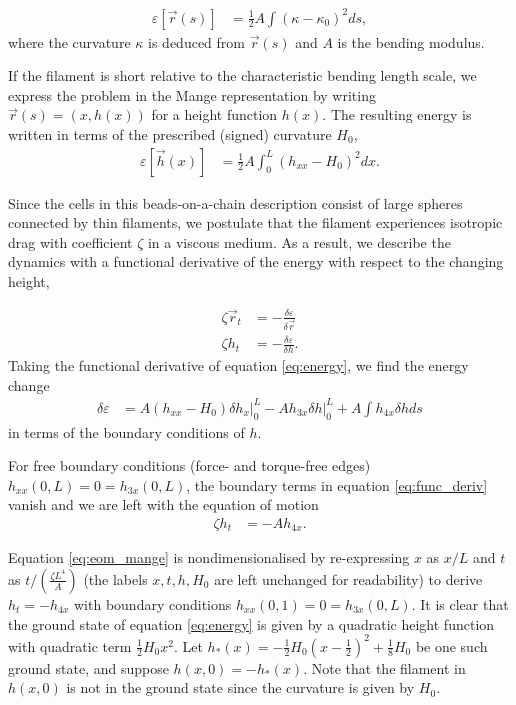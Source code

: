 \begin{align*}
    \varepsilon[\vec{r}(s)] &= \frac{1}{2} A \int (\kappa - \kappa_0)^2 ds, 
\end{align*}
\noindent where the curvature $\kappa$ is deduced from $\vec{r}(s)$ and $A$ is the bending modulus. 

If the filament is short relative to the characteristic bending length scale, we express the problem in the Mange representation by writing $\vec{r}(s) = (x, h(x))$ for a height function $h(x)$. 
The resulting energy is written in terms of the prescribed (signed) curvature $H_0$, 
\begin{align}
    \varepsilon[\vec{h}(x)] &= \frac{1}{2} A \int_0^L (h_{xx} - H_0)^2 dx. \label{eq:energy}
\end{align}

Since the cells in this beads-on-a-chain description consist of large spheres connected by thin filaments, we postulate that the filament experiences isotropic drag with coefficient $\zeta$ in a viscous medium.
As a result, we describe the dynamics with a functional derivative of the energy with respect to the changing height,

\begin{align}
    \zeta \vec{r}_t &= -\frac{\delta \varepsilon}{\delta \vec{r}} \nonumber \\
    \zeta h_t &= -\frac{\delta \varepsilon}{\delta h}. \label{eq:eom} 
\end{align}
Taking the functional derivative of equation \ref{eq:energy}, we find the energy change
\begin{align}
    \delta \varepsilon &= \left. A(h_{xx} - H_0)\delta h_x \right|_0^L - \left. Ah_{3x} \delta h \right|_0^L + A \int h_{4x} \delta h ds \label{eq:func_deriv} 
\end{align}
in terms of the boundary conditions of $h$.

For free boundary conditions (force- and torque-free edges) $h_{xx}(0, L) = 0 = h_{3x}(0, L)$, the boundary terms in equation \ref{eq:func_deriv} vanish and we are left with the equation of motion 
\begin{align}
    \zeta h_t &= -A h_{4x}. \label{eq:eom_mange}
\end{align}

Equation \ref{eq:eom_mange} is nondimensionalised by re-expressing $x$ as $x/L$ and $t$ as $t / (\frac{\zeta L^4}{A})$ (the labels $x, t, h, H_0$ are left unchanged for readability) to derive $h_t = -h_{4x}$ with boundary conditions $h_{xx}(0, 1) = 0 = h_{3x}(0, L)$. 
It is clear that the ground state of equation \ref{eq:energy} is given by a quadratic height function with quadratic term $\frac{1}{2}H_0x^2$. 
Let $h_*(x) = -\frac{1}{2} H_0(x-\frac{1}{2})^2 + \frac{1}{8}H_0$ be one such ground state, and suppose $h(x, 0) = -h_*(x)$. Note that the filament in $h(x, 0)$ is not in the ground state since the curvature is given by $H_0$. 

